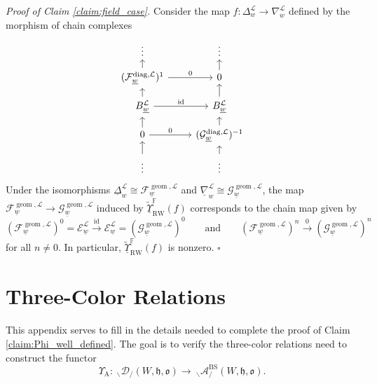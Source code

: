 \documentclass{amsart}
\newcommand{\F}{\mathbb{F}}
\newcommand{\scrF}{\mathcal{F}}
\newcommand{\scrG}{\mathcal{G}}
\newcommand{\scrE}{\mathcal{E}}
\newcommand{\scrL}{\mathcal{L}}
\DeclareMathOperator{\id}{id}
\newcommand{\fr}[1]{\mathfrak{#1}}
\DeclareMathOperator{\RW}{RW}
\DeclareMathOperator{\diag}{diag}
\DeclareMathOperator{\Abe}{A}
\DeclareMathOperator{\BS}{BS}
\DeclareMathOperator{\geom}{geom}
\newcommand{\unabla}{\underline{\nabla}}
\newcommand{\uDelta}{\underline{\Delta}}
\newcommand{\EWmon}[2]{\:_{#1 \backslash} \mathcal{D}_{/ #2} }
\newcommand{\Amon}[2]{\:_{#1 \backslash} \mathcal{A}_{/ #2} }
\newcommand{\uw}{\underline{w}}
\theoremstyle{definition}
\newenvironment{midsecproof}[1]{\vspace{\topsep} \noindent \textit{Proof of #1.}}{\hfill $\square$}
\numberwithin{equation}{subsection}
\begin{document}
\begin{midsecproof}{Claim \ref{claim:field_case}}
   Consider the map $f : \Delta_w^{\scrL} \to \nabla_w^{\scrL}$ defined by the morphism of chain complexes
   \[\begin{tikzcd}[row sep=small]
    \vdots                                                & \vdots                                    \\
    {(\scrF_{\uw}^{\diag, \scrL})^1} \arrow[r, "0"] \arrow[u] & 0 \arrow[u]                               \\
    {B_{\uw}^{\scrL}} \arrow[r, "\id"] \arrow[u]   & {B_{\uw}^{\scrL}} \arrow[u]        \\
    0 \arrow[r, "0"] \arrow[u]                            & {(\scrG_{\uw}^{\diag, \scrL})^{-1}} \arrow[u] \\
    \vdots \arrow[u]                                      & \vdots \arrow[u]                         
    \end{tikzcd}\]
   Under the isomorphisms $\uDelta_w^{\scrL} \cong \scrF_{\uw}^{\geom, \scrL}$ and $\unabla_w^{\scrL} \cong \scrG_{\uw}^{\geom, \scrL}$, the map $\scrF_{\uw}^{\geom, \scrL} \to \scrG_{\uw}^{\geom, \scrL}$ induced by $\underline{\tilde{\Upsilon}}_{\RW}^{\F} (f)$ corresponds to the chain map given by 
   \[ (\scrF_{\uw}^{\geom, \scrL})^0 = \scrE_{\uw}^{\scrL} \stackrel{\id}{\to} \scrE_{\uw}^{\scrL} = (\scrG_{\uw}^{\geom, \scrL})^0 \qquad\text{and} \qquad (\scrF_{\uw}^{\geom, \scrL})^n \stackrel{0}{\to} (\scrG_{\uw}^{\geom, \scrL})^n\]
   for all $n \neq 0$.
   In particular, $\underline{\tilde{\Upsilon}}_{\RW}^{\F} (f)$ is nonzero.
\end{midsecproof}
    
    \appendix
    \section{Three-Color Relations}\label{apdx:three_color}
This appendix serves to fill in the details needed to complete the proof of Claim \ref{claim:Phi_well_defined}.
The goal is to verify the three-color relations need to construct the functor
\[\Upsilon_{\Abe} : \EWmon{}{} (W, \fr{h}, \fr{o}) \to \Amon{}{}^{\BS} (W, \fr{h}, \fr{o}).\]
\end{document}
